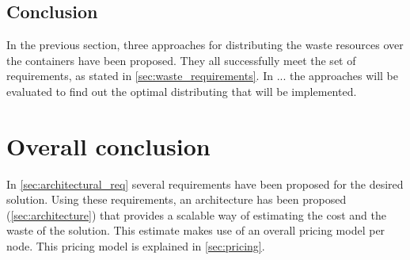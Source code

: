 \subsection{Conclusion}
In the previous section, three approaches for distributing the waste resources over the containers have been proposed. They all successfully meet the set of requirements, as stated in \autoref{sec:waste_requirements}. In ... the approaches will be evaluated to find out the optimal distributing that will be implemented.

\section{Overall conclusion}
In \autoref{sec:architectural_req} several requirements have been proposed for the desired solution. Using these requirements, an architecture has been proposed (\autoref{sec:architecture}) that provides a scalable way of estimating the cost and the waste of the solution. This estimate makes use of an overall pricing model per node. This pricing model is explained in \autoref{sec:pricing}.